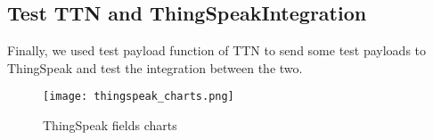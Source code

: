 \subsection{Test TTN and ThingSpeakIntegration}
Finally, we used test payload function of TTN to send some test payloads to ThingSpeak and test the integration between the two.

\begin{figure}[H]
    \centering
    \texttt{[image: thingspeak\_charts.png]}
    \caption{ThingSpeak fields charts}
\end{figure}




